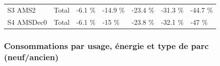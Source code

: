 \documentclass[]{article}
\begin{document}
\begin{longtable}[]{@{}lllllll@{}}
\begin{minipage}[t]{0.14\columnwidth}\raggedright\strut
S3 AMS2\strut
\end{minipage} & \begin{minipage}[t]{0.13\columnwidth}\raggedright\strut
Total\strut
\end{minipage} & \begin{minipage}[t]{0.11\columnwidth}\raggedright\strut
-6.1 \%\strut
\end{minipage} & \begin{minipage}[t]{0.11\columnwidth}\raggedright\strut
-14.9 \%\strut
\end{minipage} & \begin{minipage}[t]{0.11\columnwidth}\raggedright\strut
-23.4 \%\strut
\end{minipage} & \begin{minipage}[t]{0.11\columnwidth}\raggedright\strut
-31.3 \%\strut
\end{minipage} & \begin{minipage}[t]{0.11\columnwidth}\raggedright\strut
-44.7 \%\strut
\end{minipage}\tabularnewline
\begin{minipage}[t]{0.14\columnwidth}\raggedright\strut
S4 AMSDec0\strut
\end{minipage} & \begin{minipage}[t]{0.13\columnwidth}\raggedright\strut
Total\strut
\end{minipage} & \begin{minipage}[t]{0.11\columnwidth}\raggedright\strut
-6.1 \%\strut
\end{minipage} & \begin{minipage}[t]{0.11\columnwidth}\raggedright\strut
-15 \%\strut
\end{minipage} & \begin{minipage}[t]{0.11\columnwidth}\raggedright\strut
-23.8 \%\strut
\end{minipage} & \begin{minipage}[t]{0.11\columnwidth}\raggedright\strut
-32.1 \%\strut
\end{minipage} & \begin{minipage}[t]{0.11\columnwidth}\raggedright\strut
-47 \%\strut
\end{minipage}\tabularnewline
\bottomrule
\end{longtable}

\pagebreak

\subsubsection{Consommations par usage, énergie et type de parc
(neuf/ancien)}\label{consommations-par-usage-energie-et-type-de-parc-neufancien}
\end{document}
